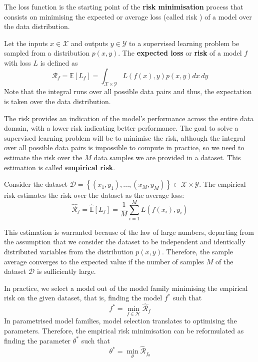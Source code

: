 The loss function is the starting point of the \textbf{risk minimisation} process that consists on minimising the expected or average loss (called risk ) of a model over the data distribution.
\begin{definicion}[Risk]
    Let the inputs $x \in \mathcal{X}$ and outputs $y \in \mathcal{Y}$ to a supervised learning problem be sampled from a distribution $p(x,y)$. The \textbf{expected loss} or \textbf{risk} of a model $f$ with loss $L$ is defined as
    \begin{equation}
        \mathcal{R}_f = \mathbb{E}[L_f] = \int_{\mathcal{X}\times \mathcal{Y}} L(f(x),y) p(x,y) dx\, dy
    \end{equation}
    Note that the integral runs over all possible data pairs and thus, the expectation is taken over the data distribution.
\end{definicion}

The risk provides an indication of the model's performance across the entire data domain, with a lower risk indicating better performance. The goal to solve a supervised learning problem will be to minimise the risk, although the integral over all possible data pairs is impossible to compute in practice, so we need to estimate the risk over the $M$ data samples we are provided in a dataset. This estimation is called \textbf{empirical risk}.
\begin{definicion}
    Consider the dataset ${\mathcal{D} = \left\lbrace (x_1,y_1),...,(x_M,y_M)\right\rbrace \subset \mathcal{X} \times \mathcal{Y}}$. The empirical risk estimates the risk over the dataset as the average loss:
    \begin{equation}
        \hat{\mathcal{R}}_f = \hat{\mathbb{E}}[L_f] = \frac{1}{M}\sum_{i=1}^M L(f(x_i), y_i)
    \end{equation}
\end{definicion}

This estimation is warranted because of the law of large numbers, departing from the assumption that we consider the dataset to be independent and identically distributed variables from the distribution $p(x,y)$. Therefore, the sample average converges to the expected value if the number of samples $M$ of the dataset $\mathcal{D}$ is sufficiently large. 

In practice, we select a model out of the model family minimising the empirical risk on the given dataset, that is, finding the model $f^*$ such that $$f^* = \min_{f \in \mathcal{H}} \hat{\mathcal{R}}_f$$
In parametrised model families, model selection translates to optimising the parameters. Therefore, the empirical risk minimisation can be reformulated as finding the parameter $\theta^*$ such that
$$\theta^*=\min_{\theta} \hat{\mathcal{R}}_{f_{\theta}}$$

